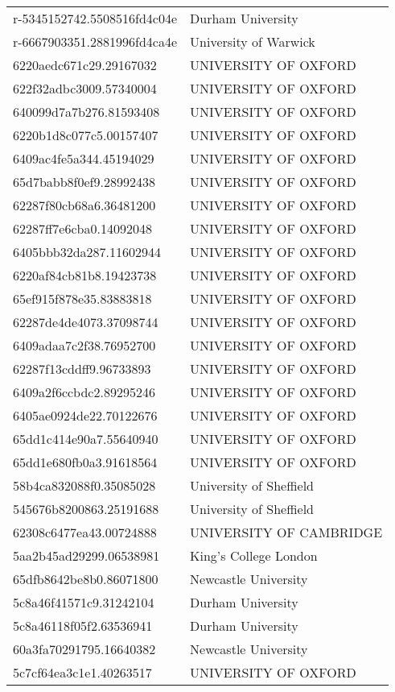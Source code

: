 \begin{tabular}{ll}
r-5345152742.5508516fd4c04e & Durham University \\
r-6667903351.2881996fd4ca4e & University of Warwick \\
6220aedc671c29.29167032 & UNIVERSITY OF OXFORD \\
622f32adbc3009.57340004 & UNIVERSITY OF OXFORD \\
640099d7a7b276.81593408 & UNIVERSITY OF OXFORD \\
6220b1d8c077c5.00157407 & UNIVERSITY OF OXFORD \\
6409ac4fe5a344.45194029 & UNIVERSITY OF OXFORD \\
65d7babb8f0ef9.28992438 & UNIVERSITY OF OXFORD \\
62287f80cb68a6.36481200 & UNIVERSITY OF OXFORD \\
62287ff7e6cba0.14092048 & UNIVERSITY OF OXFORD \\
6405bbb32da287.11602944 & UNIVERSITY OF OXFORD \\
6220af84cb81b8.19423738 & UNIVERSITY OF OXFORD \\
65ef915f878e35.83883818 & UNIVERSITY OF OXFORD \\
62287de4de4073.37098744 & UNIVERSITY OF OXFORD \\
6409adaa7c2f38.76952700 & UNIVERSITY OF OXFORD \\
62287f13cddff9.96733893 & UNIVERSITY OF OXFORD \\
6409a2f6ccbdc2.89295246 & UNIVERSITY OF OXFORD \\
6405ae0924de22.70122676 & UNIVERSITY OF OXFORD \\
65dd1c414e90a7.55640940 & UNIVERSITY OF OXFORD \\
65dd1e680fb0a3.91618564 & UNIVERSITY OF OXFORD \\
58b4ca832088f0.35085028 & University of Sheffield \\
545676b8200863.25191688 & University of Sheffield \\
62308c6477ea43.00724888 & UNIVERSITY OF CAMBRIDGE \\
5aa2b45ad29299.06538981 & King's College London \\
65dfb8642be8b0.86071800 & Newcastle University \\
5c8a46f41571c9.31242104 & Durham University \\
5c8a46118f05f2.63536941 & Durham University \\
60a3fa70291795.16640382 & Newcastle University \\
5c7cf64ea3c1e1.40263517 & UNIVERSITY OF OXFORD \\

\end{tabular}
